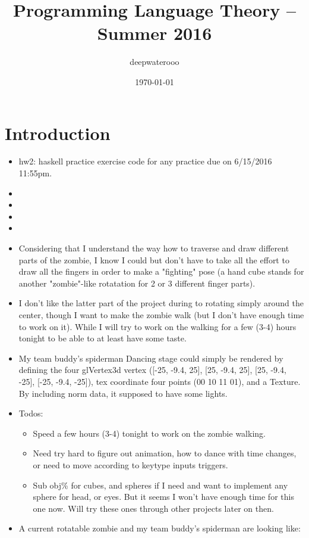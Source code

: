 \documentclass[9pt,b5paper]{article}
\author{deepwaterooo}
\date{\today}
\title{Programming Language Theory -- Summer 2016}
\begin{document}
\maketitle
\tableofcontents


\section{Introduction}
\label{sec-1}
\begin{itemize}
\item hw2: haskell practice exercise code for any practice due on 6/15/2016 11:55pm.
\item 
\item 
\item 
\item 
\item Considering that I understand the way how to traverse and draw different parts of the zombie, I know I could but don't have to take all the effort to draw all the fingers in order to make a "fighting" pose (a hand cube stands for another "zombie"-like rotatation for 2 or 3 different finger parts).
\item I don't like the latter part of the project during to rotating simply around the center, though I want to make the zombie walk (but I don't have enough time to work on it). While I will try to work on the walking for a few (3-4) hours tonight to be able to at least have some taste.
\item My team buddy's spiderman Dancing stage could simply be rendered by defining the four glVertex3d vertex ([-25, -9.4, 25], [25, -9.4, 25], [25, -9.4, -25], [-25, -9.4, -25]), tex coordinate four points (00 10 11 01), and a Texture. By including norm data, it supposed to have some lights.
\item Todos: 
\begin{itemize}
\item Speed a few hours (3-4) tonight to work on the zombie walking.
\item Need try hard to figure out animation, how to dance with time changes, or need to move according to keytype inputs triggers.
\item Sub obj\% for cubes, and spheres if I need and want to implement any sphere for head, or eyes. But it seems I won't have enough time for this one now. Will try these ones through other projects later on then.
\end{itemize}
\item A current rotatable zombie and my team buddy's spiderman are looking like:
\end{itemize}
\end{document}
